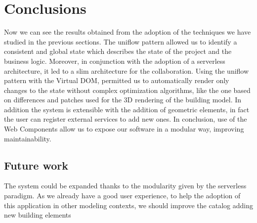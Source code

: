 \section{Conclusions}\label{sec:conclusions}

Now we can see the results obtained from the adoption of the techniques we have studied in the previous sections. The uniflow pattern allowed us to identify a consistent and global state which describes the state of the project and the business logic. Moreover, in conjunction with the adoption of a serverless architecture, it led to a slim architecture for the collaboration. Using the uniflow pattern with the Virtual DOM, permitted us to automatically render only changes to the state without complex optimization algorithms, like the one based on differences and patches used for the 3D rendering of the building model. In addition the system is extensible with the addition of geometric elements, in fact the user can register external services to add new ones. In conclusion, use of the Web Components allow us to expose our software in a modular way, improving maintainability.

\subsection{Future work}

The system could be expanded thanks to the modularity given by the serverless paradigm. As we already have a good user experience, to help the adoption of this application in other modeling contexts, we should improve the catalog adding new building elements